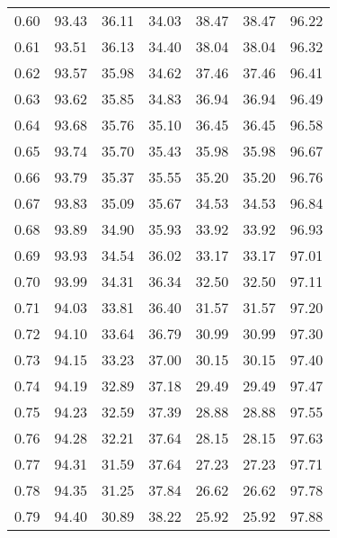 \begin{tabular}{|c|c|c|c|c|c|c|}
      0.60 &     93.43 &     36.11 &      34.03 &   38.47 &      38.47 &         96.22 \\
      0.61 &     93.51 &     36.13 &      34.40 &   38.04 &      38.04 &         96.32 \\
      0.62 &     93.57 &     35.98 &      34.62 &   37.46 &      37.46 &         96.41 \\
      0.63 &     93.62 &     35.85 &      34.83 &   36.94 &      36.94 &         96.49 \\
      0.64 &     93.68 &     35.76 &      35.10 &   36.45 &      36.45 &         96.58 \\
      0.65 &     93.74 &     35.70 &      35.43 &   35.98 &      35.98 &         96.67 \\
      0.66 &     93.79 &     35.37 &      35.55 &   35.20 &      35.20 &         96.76 \\
      0.67 &     93.83 &     35.09 &      35.67 &   34.53 &      34.53 &         96.84 \\
      0.68 &     93.89 &     34.90 &      35.93 &   33.92 &      33.92 &         96.93 \\
      0.69 &     93.93 &     34.54 &      36.02 &   33.17 &      33.17 &         97.01 \\
      0.70 &     93.99 &     34.31 &      36.34 &   32.50 &      32.50 &         97.11 \\
      0.71 &     94.03 &     33.81 &      36.40 &   31.57 &      31.57 &         97.20 \\
      0.72 &     94.10 &     33.64 &      36.79 &   30.99 &      30.99 &         97.30 \\
      0.73 &     94.15 &     33.23 &      37.00 &   30.15 &      30.15 &         97.40 \\
      0.74 &     94.19 &     32.89 &      37.18 &   29.49 &      29.49 &         97.47 \\
      0.75 &     94.23 &     32.59 &      37.39 &   28.88 &      28.88 &         97.55 \\
      0.76 &     94.28 &     32.21 &      37.64 &   28.15 &      28.15 &         97.63 \\
      0.77 &     94.31 &     31.59 &      37.64 &   27.23 &      27.23 &         97.71 \\
      0.78 &     94.35 &     31.25 &      37.84 &   26.62 &      26.62 &         97.78 \\
      0.79 &     94.40 &     30.89 &      38.22 &   25.92 &      25.92 &         97.88 \\

\end{tabular}
